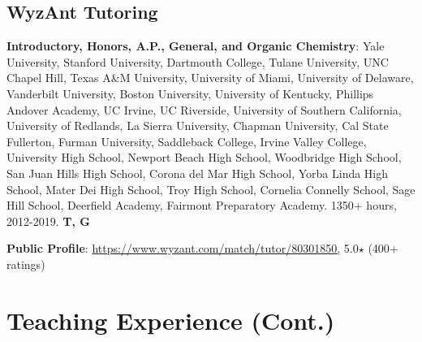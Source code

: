 \documentclass[10pt]{article}
\newcommand*\teitem[4]{\textbf{#1}: #2 #3 \textbf{#4}}
\begin{document}
\vspace*{-2mm}  \vspace*{-2mm}


\subsection{WyzAnt Tutoring}


\teitem{Introductory, Honors, A.P., General, and Organic Chemistry}{Yale University, Stanford University, Dartmouth College, Tulane University, UNC Chapel Hill, Texas A\&M University, University of Miami, University of Delaware, Vanderbilt University, Boston University, University of Kentucky, Phillips Andover Academy, UC Irvine, UC Riverside, University of Southern California, University of Redlands, La Sierra University, Chapman University, Cal State Fullerton, Furman University, Saddleback College, Irvine Valley College, 
University High School, Newport Beach High School, Woodbridge High School, San Juan Hills High School, Corona del Mar High School, Yorba Linda High School, Mater Dei High School, Troy High School, Cornelia Connelly School, Sage Hill School, Deerfield Academy, Fairmont Preparatory Academy.}{1350+ hours, 2012-2019.}{T, G} 

\teitem{Public Profile}{\href{https://www.wyzant.com/match/tutor/80301850}{https://www.wyzant.com/match/tutor/80301850,}}{5.0$\star$ (400+ ratings)}{}


\section{Teaching Experience (Cont.)}
\end{document}
